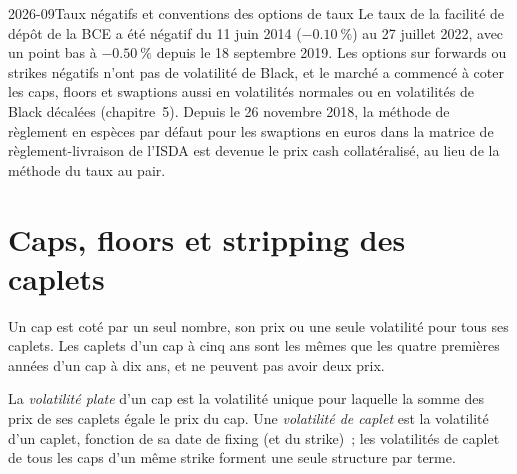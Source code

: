 \begin{omfigure}

\label{fig:rc:vanilla-rates-options:smile}
\end{omfigure}

\begin{dated}{2026-09}{Taux négatifs et conventions des options de taux}\label{dat:rc:vanilla-rates-options:negative}
Le taux de la facilité de dépôt de la BCE a été négatif du 11 juin 2014 ($-0.10~\%$) au 27
juillet 2022, avec un point bas à $-0.50~\%$ depuis le 18 septembre 2019. Les options sur
forwards ou strikes négatifs n'ont pas de volatilité de Black, et le marché a commencé à coter les caps,
floors et swaptions aussi en volatilités normales ou en volatilités de Black décalées
(chapitre~5). Depuis le 26 novembre 2018, la méthode de règlement en espèces par défaut pour
les swaptions en euros dans la matrice de règlement-livraison de l'ISDA est devenue le prix cash
collatéralisé, au lieu de la méthode du taux au pair.
\end{dated}

\section{Caps, floors et stripping des caplets}

Un cap est coté par un seul nombre, son prix ou une seule volatilité pour tous ses
caplets. Les caplets d'un cap à cinq ans sont les mêmes que les quatre premières
années d'un cap à dix ans, et ne peuvent pas avoir deux prix.

\begin{definition}\label{def:rc:vanilla-rates-options:flat}
La \emph{volatilité plate} d'un cap est la volatilité unique
pour laquelle la somme des prix de ses caplets égale le prix du cap. Une
\emph{volatilité de caplet} est la volatilité d'un
caplet, fonction de sa date de fixing (et du strike)~; les volatilités de caplet de
tous les caps d'un même strike forment une seule structure par terme.
\end{definition}

